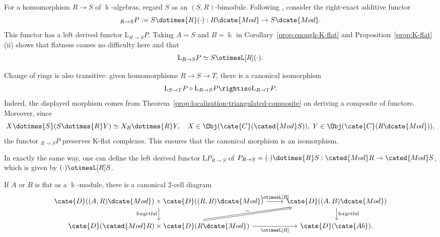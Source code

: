 \begin{example}\label{eg:change-of-rings}
	For a homomorphism $R\to S$ of $\Bbbk$-algebras, regard $S$ as an
	$(S,R)$-bimodule. Following \cite[Corollary 6.6.8]{Li1}, consider the
	right-exact additive functor
	\begin{equation*}
		{}_{R \to S} P := S \dotimes{R} (\cdot): R\dcate{Mod} \to S\dcate{Mod} .
	\end{equation*}
	This functor has a left derived functor $\mathrm{L}{}_{R\to S}P$.
	Taking $A=S$ and $B=\Bbbk$ in Corollary~\ref{prop:enough-K-flat} and
	Proposition~\ref{prop:K-flat} (ii) shows that flatness causes no difficulty
	here and that
	\[ \mathrm{L}{}_{R \to S} P \simeq S \otimesL[R] (\cdot) . \]

	Change of rings is also transitive: given homomorphisms $R\to S\to T$,
	there is a canonical isomorphism
	\[ \mathrm{L} {}_{S \to T} P \circ \mathrm{L} {}_{R \to S} P \rightiso \mathrm{L} {}_{R \to T} P. \]
	Indeed, the displayed morphism comes from
	Theorem~\ref{prop:localization-triangulated-composite} on deriving a
	composite of functors. Moreover, since
	\[ X \dotimes{S} (S \dotimes{R} Y) \simeq X_R \dotimes{R} Y, \quad X \in \Obj(\cate{C}(\cated{Mod}S)), \; Y \in \Obj(\cate{C}(R\dcate{Mod})), \]
	the functor ${}_{R\to S}P$ preserves K-flat complexes. This ensures that
	the canonical morphism is an isomorphism.

	In exactly the same way, one can define the left derived functor
	$\mathrm{L}P_{R\to S}$ of
	$P_{R\to S}=(\cdot)\dotimes{R}S:\cated{Mod}R\to\cated{Mod}S$, which is
	given by $(\cdot)\otimesL[R]S$.
\end{example}

\begin{proposition}\label{prop:otimesL-enrichment}
	If $A$ or $B$ is flat as a $\Bbbk$-module, there is a canonical $2$-cell
	diagram
	\[\begin{tikzcd}
		\cate{D}((A, R)\dcate{Mod}) \times \cate{D}((R, B)\dcate{Mod}) \arrow[r, "{\otimesL[R]}"] \arrow[d, "\text{forgetful}"'] & \cate{D}((A, B)\dcate{Mod}) \arrow[d, "\text{forgetful}"] \\
		\cate{D}(\cated{Mod}R) \times \cate{D}(R\dcate{Mod}) \arrow[r, "{\otimesL[R]}"'] \arrow[Rightarrow, ru, "\sim", sloped] & \cate{D}(\cate{Ab}) .
	\end{tikzcd}\]
\end{proposition}

